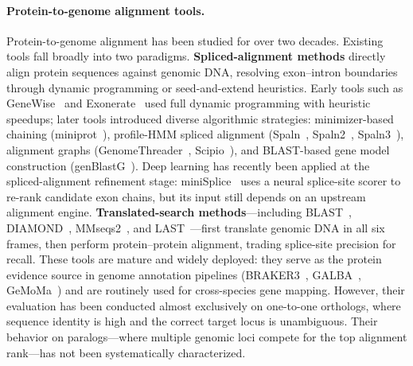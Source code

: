 \paragraph{Protein-to-genome alignment tools.}
Protein-to-genome alignment has been studied for over two decades. Existing tools fall broadly into two paradigms. \textbf{Spliced-alignment methods} directly align protein sequences against genomic DNA, resolving exon--intron boundaries through dynamic programming or seed-and-extend heuristics. Early tools such as GeneWise~\cite{birney2004genewise} and Exonerate~\cite{slater2005exonerate} used full dynamic programming with heuristic speedups; later tools introduced diverse algorithmic strategies: minimizer-based chaining (miniprot~\cite{li2023miniprot}), profile-HMM spliced alignment (Spaln~\cite{gotoh2008spaln}, Spaln2~\cite{iwata2012spaln2}, Spaln3~\cite{gotoh2024spaln3}), alignment graphs (GenomeThreader~\cite{gremme2005genomethreader}, Scipio~\cite{keller2008scipio}), and BLAST-based gene model construction (genBlastG~\cite{she2011genblastg}). Deep learning has recently been applied at the spliced-alignment refinement stage: miniSplice~\cite{zhang2025minisplice,yang2025minisplice} uses a neural splice-site scorer to re-rank candidate exon chains, but its input still depends on an upstream alignment engine. \textbf{Translated-search methods}—including BLAST~\cite{altschul1990blast}, DIAMOND~\cite{buchfink2021diamond}, MMseqs2~\cite{steinegger2017mmseqs2}, and LAST~\cite{kielbasa2011last}—first translate genomic DNA in all six frames, then perform protein--protein alignment, trading splice-site precision for recall. These tools are mature and widely deployed: they serve as the protein evidence source in genome annotation pipelines (BRAKER3~\cite{gabriel2024braker3}, GALBA~\cite{bruna2023galba}, GeMoMa~\cite{keilwagen2016gemoma,keilwagen2018gemoma}) and are routinely used for cross-species gene mapping. However, their evaluation has been conducted almost exclusively on one-to-one orthologs, where sequence identity is high and the correct target locus is unambiguous. Their behavior on paralogs—where multiple genomic loci compete for the top alignment rank—has not been systematically characterized.

